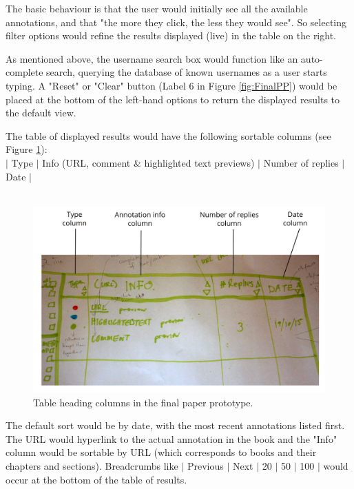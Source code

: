 The basic behaviour is that the user would initially see all the available annotations, and that "the more they click, the less they would see". So selecting filter options would refine the results displayed (live) in the table on the right. 

As mentioned above, the username search box would function like an auto-complete search, querying the database of known usernames as a user starts typing. A "Reset" or "Clear" button (Label 6 in Figure \ref{fig:FinalPP}) would be placed at the bottom of the left-hand options to return the displayed results to the default view. 

The table of displayed results would have the following sortable columns (see Figure \ref{fig:TableHead}): \\
$\vert$ Type $\vert$ Info (URL, comment \& highlighted text previews) $\vert$ Number of replies $\vert$ Date $\vert$\\
\\
\begin{figure}[h!]
    \centering
   \includegraphics[width=\textwidth]{Figures/forweb/PDColumnHeadingLabelssmall.png}
 \caption{Table heading columns in the final paper prototype.}
 \label{fig:TableHead}
\end{figure}
The default sort would be by date, with the most recent annotations listed first. The URL would hyperlink to the actual annotation in the book and the "Info" column would be sortable by URL (which corresponds to books and their chapters and sections). Breadcrumbs like $\vert$ Previous $\vert$ Next $\vert$ 20 $\vert$ 50 $\vert$ 100 $\vert$ would occur at the bottom of the table of results. 

